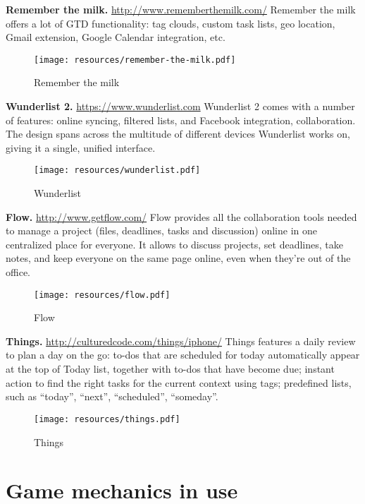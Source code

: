 \textbf{Remember the milk.} \url{http://www.rememberthemilk.com/} Remember the milk offers a lot of GTD functionality: tag clouds, custom task lists, geo location, Gmail extension, Google Calendar integration, etc.

\begin{figure}
   \centering
	\texttt{[image: resources/remember-the-milk.pdf]}
	\caption[Remember the milk]{Remember the milk}
\end{figure}

\textbf{Wunderlist 2.} \url{https://www.wunderlist.com} Wunderlist 2 comes with a number of features: online syncing, filtered lists, and Facebook integration, collaboration. The design spans across the multitude of different devices Wunderlist works on, giving it a single, unified interface.

\begin{figure}
   \centering
	\texttt{[image: resources/wunderlist.pdf]}
	\caption[Wunderlist]{Wunderlist}
\end{figure}

\textbf{Flow.} \url{http://www.getflow.com/} Flow provides all the collaboration tools needed to manage a project (files, deadlines, tasks and discussion) online in one centralized place for everyone. It allows to discuss projects, set deadlines, take notes, and keep everyone on the same page online, even when they're out of the office.

\begin{figure}
   \centering
	\texttt{[image: resources/flow.pdf]}
	\caption[Flow]{Flow}
\end{figure}

\textbf{Things.} \url{http://culturedcode.com/things/iphone/} Things features a daily review to plan a day on the go: to-dos that are scheduled for today automatically appear at the top of Today list, together with to-dos that have become due; instant action to find the right tasks for the current context using tags; predefined lists, such as ``today'', ``next'', ``scheduled'', ``someday''.

\begin{figure}
   \centering
	\texttt{[image: resources/things.pdf]}
	\caption[Things]{Things}
\end{figure}

\section{Game mechanics in use}

